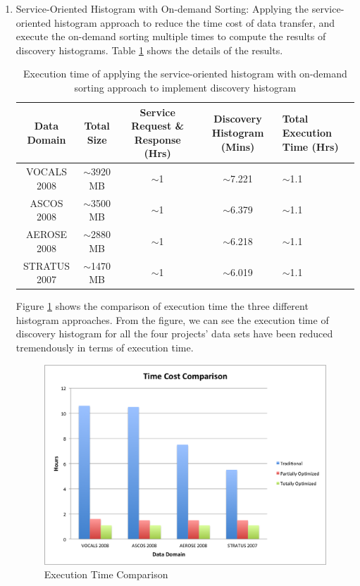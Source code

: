 \documentclass[times, 10pt,onecolumn]{article} %
\begin{document}
\begin{enumerate}
\item{Service-Oriented Histogram with On-demand Sorting:} Applying the service-oriented histogram approach to reduce the time cost of data transfer, and execute the on-demand sorting multiple times to compute the results of discovery histograms. Table \ref{tbl:3rdStr} shows the details of the results.



\begin{table}[!iht]
\centering
\begin{tabular}{|c|c|c|c|p{3cm}|}
\hline
\textbf{Data Domain} & \textbf{Total Size} &\textbf{ Service Request \& Response (Hrs)}  & \textbf{Discovery Histogram (Mins)} & \textbf{Total Execution Time (Hrs)}  \\ \hline
VOCALS 2008 &  $\sim$3920 MB & $\sim$1 & $\sim$7.221 & $\sim$1.1\\ \hline
ASCOS 2008 & $\sim$3500 MB & $\sim$1 & $\sim$6.379& $\sim$1.1\\ \hline 
AEROSE 2008 & $\sim$2880 MB & $\sim$1 & $\sim$6.218&  $\sim$1.1 \\\hline 
STRATUS 2007 & $\sim$1470 MB & $\sim$1  & $\sim$6.019&  $\sim$1.1\\\hline
\end{tabular}
\caption{ Execution time of applying the service-oriented histogram with on-demand sorting approach to implement discovery histogram}
\label{tbl:3rdStr}
\end{table}

Figure \ref{fig:TCC} shows the comparison of execution time the three different histogram approaches. From the figure, we can see the execution time of discovery histogram for all the four projects' data sets have been reduced tremendously in terms of execution time. 

\begin{figure}[!iht]
\begin{center}
  \includegraphics[scale=0.55]{TimeComp.png}
  \caption{Execution Time Comparison}
  \label{fig:TCC}
\end{center}
\vspace*{-4ex}
\end{figure}

\end{enumerate}
\end{document}
